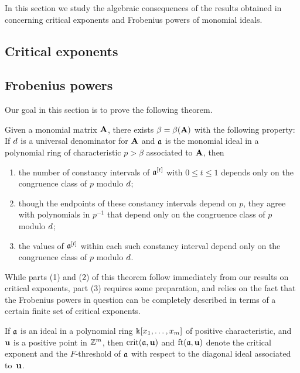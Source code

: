 \documentclass{amsart}
\begin{document}
In this section we study the algebraic consequences of the results obtained in  concerning critical exponents and Frobenius powers of monomial ideals.

\subsection{Critical exponents}
\label{crits: SS}

\subsection{Frobenius powers}
\label{Fobenius powers: SS}

Our goal in this section is to prove the following theorem.

\begin{theorem}
	\label{frobenius-powers-main: T}
	Given a monomial matrix $\mathbf{A}$, there exists $\beta = \beta(\mathbf{A})$ with the following property\textup:
        If $d$ is a universal denominator for $\mathbf{A}$ and $\mathfrak{a}$ is the monomial ideal in a polynomial ring of characteristic $p>\beta$ associated to $\mathbf{A}$, then 
	\begin{enumerate}[$(1)$]
	\item the number of constancy intervals of $\mathfrak{a}^{[t]}$ with $0 \le t \le 1$ depends only on the congruence class of $p$ modulo $d$\textup;
	\item though the endpoints of these constancy intervals depend on $p$, they agree with polynomials in $p^{-1}$ that depend only on the congruence class of $p$ modulo $d$\textup;
	\item the values of $\mathfrak{a}^{[t]}$ within each such constancy interval depend only on the congruence class of $p$ modulo $d$.
	\end{enumerate}	
\end{theorem}

While parts (1) and (2) of this theorem follow immediately from our results on critical exponents, part (3) requires some preparation, and relies on the fact that the Frobenius powers in question can be completely described in terms of a certain finite set of critical exponents.

\begin{notation}
   If $\mathfrak{a}$ is an ideal in a polynomial ring $\Bbbk[x_1,\ldots,x_m]$ of positive characteristic, and $\mathbf{u}$ is a positive point in $\mathbb{Z}^m$, then $\operatorname{crit}(\mathfrak{a},\mathbf{u})$ and $\operatorname{ft}(\mathfrak{a}, \mathbf{u})$ denote the critical exponent and the $F$-threshold of $\mathfrak{a}$ with respect to the diagonal ideal associated to~$\mathbf{u}$.
\end{notation}
\end{document}
